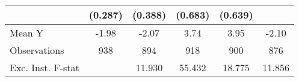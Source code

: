{\begin{tabular}{l*{5}{c}}
            &     (0.287)         &     (0.388)         &     (0.683)         &     (0.639)         &                     \\
\midrule
Mean Y      &       -1.98         &       -2.07         &        3.74         &        3.95         &       -2.10         \\
Observations&         938         &         894         &         918         &         900         &         876         \\
Exc. Inst. F-stat&                     &      11.930         &      55.432         &      18.775         &      11.856         \\
\bottomrule
\end{tabular}
}
